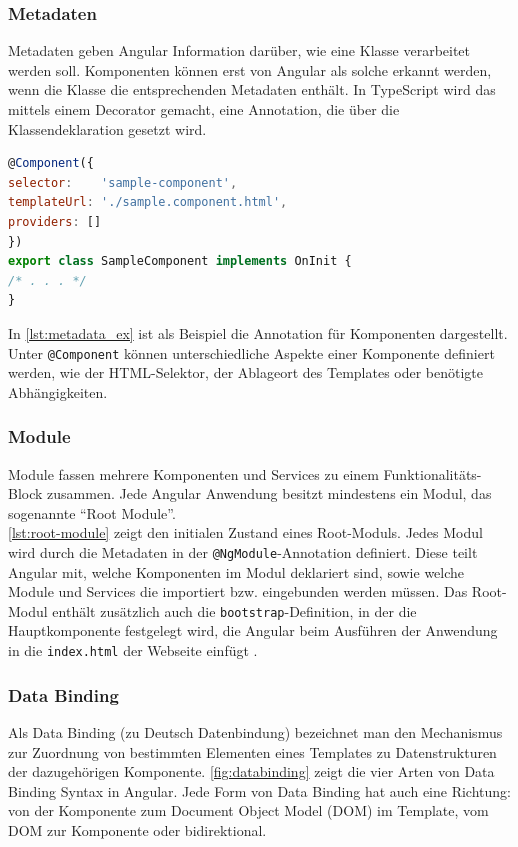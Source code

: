 \subsubsection{Metadaten}
Metadaten geben Angular Information darüber, wie eine Klasse verarbeitet werden soll. Komponenten können erst von Angular als solche erkannt werden, wenn die Klasse die entsprechenden Metadaten enthält.
In TypeScript wird das mittels einem Decorator gemacht, eine Annotation, die über die Klassendeklaration gesetzt wird.
\\
\begin{lstlisting}[language=JavaScript,caption={Beispiel Metadaten-Annotation für Komponenten},label=lst:metadata_ex]
@Component({
selector:    'sample-component',
templateUrl: './sample.component.html',
providers: []
})
export class SampleComponent implements OnInit {
/* . . . */
}
\end{lstlisting}

In \cref{lst:metadata_ex} ist als Beispiel die Annotation für Komponenten dargestellt. Unter \texttt{@Component} können unterschiedliche Aspekte einer Komponente definiert werden, wie der \acs{HTML}-Selektor, der Ablageort des Templates oder benötigte Abhängigkeiten.

\subsubsection{Module}
Module fassen mehrere Komponenten und Services zu einem Funktionalitäts-Block zusammen. Jede Angular Anwendung besitzt mindestens ein Modul, das sogenannte \enquote{Root Module}.
\\


\cref{lst:root-module} zeigt den initialen Zustand eines Root-Moduls. Jedes Modul wird durch die Metadaten in der \texttt{@NgModule}-Annotation definiert.
Diese teilt Angular mit, welche Komponenten im Modul deklariert sind, sowie welche Module und Services die importiert bzw. eingebunden werden müssen.
Das Root-Modul enthält zusätzlich auch die \texttt{bootstrap}-Definition, in der die Hauptkomponente festgelegt wird, die Angular beim Ausführen der Anwendung in die \texttt{index.html} der Webseite einfügt \cite{Angular.io2017a}.

\subsubsection{Data Binding}
Als Data Binding (zu Deutsch Datenbindung) bezeichnet man den Mechanismus zur Zuordnung von bestimmten Elementen eines Templates zu Datenstrukturen der dazugehörigen Komponente.
\cref{fig:databinding} zeigt die vier Arten von Data Binding Syntax in Angular.
Jede Form von Data Binding hat auch eine Richtung: von der Komponente zum Document Object Model (\acs{DOM}) im Template, vom \acs{DOM} zur Komponente oder bidirektional.

